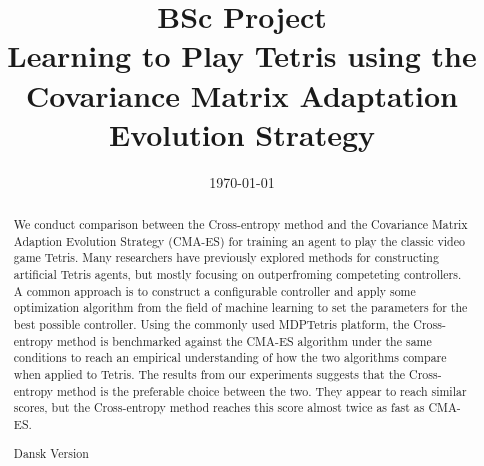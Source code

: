 







\title{BSc Project\\\textbf{Learning to Play Tetris using
    the Covariance Matrix Adaptation
    Evolution Strategy}}
\date{\today}
\maketitle

\tableofcontents

\clearpage

\begin{abstract}
We conduct comparison between 
the Cross-entropy method and the Covariance Matrix Adaption
Evolution Strategy (CMA-ES) for training 
an agent to play the classic video game Tetris. Many researchers have 
previously explored methods for constructing artificial Tetris
agents, but mostly focusing on outperfroming competeting controllers.
A common approach is to construct a configurable controller
and apply some optimization algorithm from the field of machine learning
to set the parameters for the best possible controller. Using the 
commonly used MDPTetris \citep{mdptetris} platform, the Cross-entropy
method is benchmarked against the CMA-ES algorithm under the same
conditions to reach an empirical understanding of how the two algorithms
compare when applied to Tetris. The results from our experiments
suggests that the Cross-entropy method is the preferable choice
between the two. They appear to reach similar scores, 
but the Cross-entropy method reaches this score almost twice as
fast as CMA-ES.
\end{abstract}

\begin{abstract}
Dansk Version
\end{abstract}















\clearpage




\clearpage

\begin{appendices}



\end{appendices}


